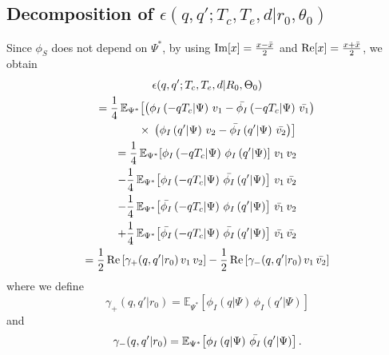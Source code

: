 {\subsection{Decomposition of $\epsilon(q, q';T_{c},T_{e},d|r_0, \theta_0)$}
\label{ssec:decomposition3}
Since $\phi_{S}$ does not depend on $\Psi^*$, by using $\textrm{\normalfont Im}[x] = \frac{x-\Bar{x}}{2}$ and $\text{Re}[x] = \frac{x+\Bar{x}}{2}$, we obtain
\begin{multline}
    \epsilon(q, q';T_{c},T_{e},d|R_0, \Theta_0) \\
    = \frac{1}{4}\,\mathbb E_{\Psi^*}\!\left[\left(\phi_{I}\left(-q T_{c}| \Psi\right)\,v_1-\Bar{\phi_{I}}\left(-q T_{c}| \Psi\right)\,\Bar{v_1}\right)\right. \\
    \qquad \times \,\left.\left(\phi_{I}\left(q'| \Psi\right)\,v_2-\Bar{\phi_{I}}\left(q'| \Psi\right)\,\Bar{v_2}\right)\right]\\
    = \frac{1}{4}\,\mathbb E_{\Psi^*}\!\left[\phi_{I}\left(-q T_{c}| \Psi\right)\,\phi_{I}\left(q'| \Psi\right)\right]\,v_1\,v_2\\
    -\frac{1}{4}\,\mathbb E_{\Psi^*}\!\left[\phi_{I}\left(-q T_{c}| \Psi\right)\,\Bar{\phi_{I}}\left(q'| \Psi\right)\right]\,v_1\,\Bar{v_2}\\
    -\frac{1}{4}\,\mathbb E_{\Psi^*}\!\left[\Bar{\phi_{I}}\left(-q T_{c}| \Psi\right)\,\phi_{I}\left(q'| \Psi\right)\right]\,\Bar{v_1}\,v_2\\
    +\frac{1}{4}\,\mathbb E_{\Psi^*}\!\left[\Bar{\phi_{I}}\left(-q T_{c}| \Psi\right)\,\Bar{\phi_{I}}\left(q'| \Psi\right)\right]\,\Bar{v_1}\,\Bar{v_2}\\
    = \frac{1}{2}\,\text{Re}\left[\gamma_+(q, q'|r_0)\,v_1\,v_2\right]-\frac{1}{2}\,\text{Re}\left[\gamma_-(q, q'|r_0)\,v_1\,\Bar{v_2}\right]
\end{multline}where we define
\begin{equation}\label{eq:g+}
    \gamma_+(q, q'|r_0) = \mathbb E_{\Psi^*}\!\left[\phi_{I}\left(q| \Psi\right)\,\phi_{I}\left(q'| \Psi\right)\right]
\end{equation} and 
\begin{equation}\label{eq:g-}
    \gamma_-(q, q'|r_0) = \mathbb E_{\Psi^*}\!\left[\phi_{I}\left(q| \Psi\right)\,\Bar{\phi_{I}}\left(q'| \Psi\right)\right].
\end{equation}


}
